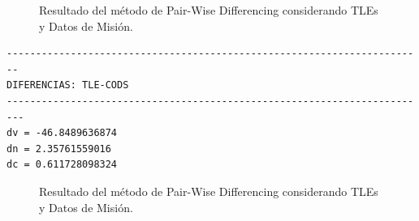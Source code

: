 \begin{figure}[htbp]
 \centering
 \caption{Resultado del m\'etodo de Pair-Wise Differencing considerando TLEs y Datos de Misi\'on.}
 \label{fig:test}
\end{figure}

\begin{verbatim}
------------------------------------------------------------------------
DIFERENCIAS: TLE-CODS
-------------------------------------------------------------------------
dv = -46.8489636874
dn = 2.35761559016
dc = 0.611728098324
\end{verbatim}

\begin{figure}[htbp]
 \centering
 \caption{Resultado del m\'etodo de Pair-Wise Differencing considerando TLEs y Datos de Misi\'on.}
 \label{fig:test}
\end{figure}

